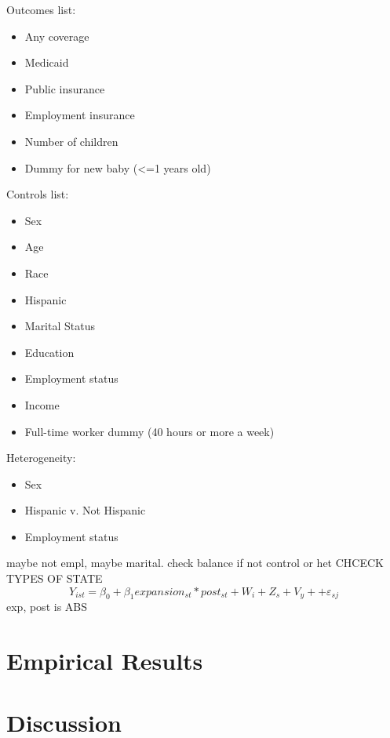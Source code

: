 \documentclass{article}
\begin{document}
Outcomes list:
\begin{itemize}
    \item Any coverage
    \item Medicaid
    \item Public insurance
    \item Employment insurance
    \item Number of children
    \item Dummy for new baby (<=1 years old)

\end{itemize}

Controls list:
\begin{itemize}
    \item Sex
    \item Age
    \item Race
    \item Hispanic
    \item Marital Status
    \item Education
    \item Employment status
    \item Income
    \item Full-time worker dummy (40 hours or more a week)
\end{itemize}

Heterogeneity:
\begin{itemize}
    \item Sex
    \item Hispanic v. Not Hispanic
    \item Employment status
\end{itemize}


maybe not empl, maybe marital. check balance if not control or het
CHCECK TYPES OF STATE 
\begin{equation}
    Y_{ist} = \beta_0 + \beta_1 expansion_{st}*post_{st} +  W_{i} + Z_{s} + V_{y}+ + \varepsilon_{sj}
\end{equation}
exp, post is ABS 

\section{Empirical Results}


\section{Discussion}


\newpage

\end{document}
